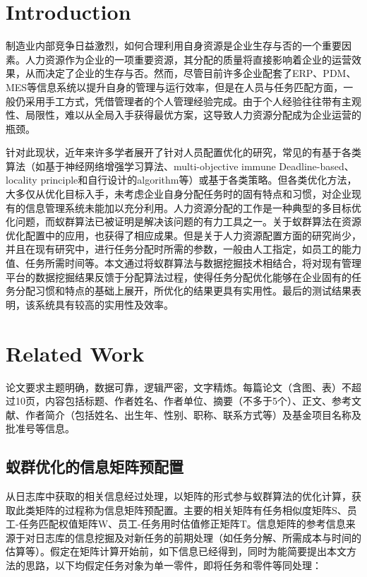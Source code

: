 \documentclass{seu-report}
\begin{document}
\twocolumn[\makeheader]

\makeauthorinfo

\section{Introduction}
制造业内部竞争日益激烈，如何合理利用自身资源是企业生存与否的一个重要因素。人力资源作为企业的一项重要资源，其分配的质量将直接影响着企业的运营效果，从而决定了企业的生存与否。然而，尽管目前许多企业配套了ERP、PDM、MES等信息系统以提升自身的管理与运行效率，但是在人员与任务匹配方面，一般仍采用手工方式，凭借管理者的个人管理经验完成。由于个人经验往往带有主观性、局限性，难以从全局入手获得最优方案，这导致人力资源分配成为企业运营的瓶颈。

针对此现状，近年来许多学者展开了针对人员配置优化的研究，常见的有基于各类算法（如基于神经网络增强学习算法、multi-objective immune Deadline-based、locality principle和自行设计的algorithm等）或基于各类策略。但各类优化方法，大多仅从优化目标入手，未考虑企业自身分配任务时的固有特点和习惯，对企业现有的信息管理系统未能加以充分利用。人力资源分配的工作是一种典型的多目标优化问题，而蚁群算法已被证明是解决该问题的有力工具之一。关于蚁群算法在资源优化配置中的应用，也获得了相应成果。但是关于人力资源配置方面的研究尚少，并且在现有研究中，进行任务分配时所需的参数，一般由人工指定，如员工的能力值、任务所需时间等。本文通过将蚁群算法与数据挖掘技术相结合，将对现有管理平台的数据挖掘结果反馈于分配算法过程，使得任务分配优化能够在企业固有的任务分配习惯和特点的基础上展开，所优化的结果更具有实用性。最后的测试结果表明，该系统具有较高的实用性及效率。


\section{Related Work}
论文要求主题明确，数据可靠，逻辑严密，文字精炼。每篇论文（含图、表）不超过10页，内容包括标题、作者姓名、作者单位、摘要（不多于5个）、正文、参考文献、作者简介（包括姓名、出生年、性别、职称、联系方式等）及基金项目名称及批准号等信息。

\subsection{蚁群优化的信息矩阵预配置}
从日志库中获取的相关信息经过处理，以矩阵的形式参与蚁群算法的优化计算，获取此类矩阵的过程称为信息矩阵预配置。主要的相关矩阵有任务相似度矩阵S、员工-任务匹配权值矩阵W、员工-任务用时估值修正矩阵T。信息矩阵的参考信息来源于对日志库的信息挖掘及对新任务的前期处理（如任务分解、所需成本与时间的估算等）。假定在矩阵计算开始前，如下信息已经得到，同时为能简要提出本文方法的思路，以下均假定任务对象为单一零件，即将任务和零件等同处理：
\end{document}
